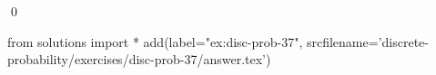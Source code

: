 
\begin{ex} 
  \label{ex:disc-prob-37}
  
  \qed
\end{ex} 
\begin{python0}
from solutions import *
add(label="ex:disc-prob-37",
    srcfilename='discrete-probability/exercises/disc-prob-37/answer.tex') 
\end{python0}
